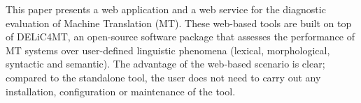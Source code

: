 This paper presents a web application and a web service for the diagnostic evaluation of Machine Translation (MT). These web-based tools are built on top
 of DELiC4MT, an open-source software package that assesses the performance of
 MT systems over user-defined linguistic phenomena (lexical, morphological,
 syntactic and semantic). The advantage of the web-based scenario is clear;
 compared to the standalone tool, the user does not need to carry out any
 installation, configuration or maintenance of the tool.

